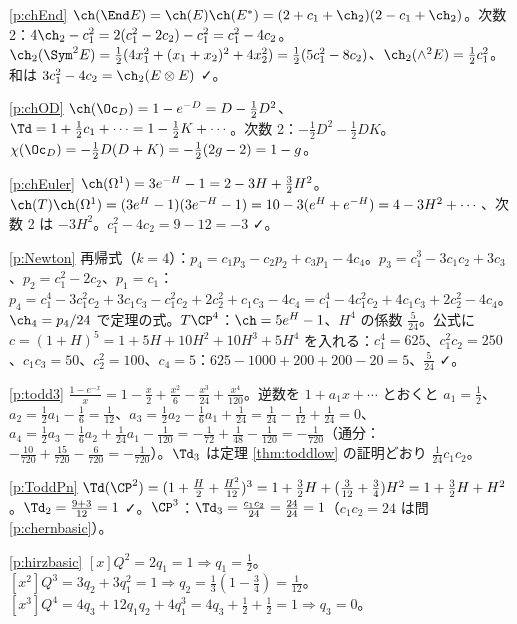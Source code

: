 \begin{sol}{\ref{p:chEnd}}
$\ch(\End E)=\ch(E)\ch(E^*)=(2+c_1+\ch_2)(2-c_1+\ch_2)$。次数 2：$4\ch_2-c_1^2=2(c_1^2-2c_2)-c_1^2=c_1^2-4c_2$。$\ch_2(\Sym^2E)=\frac12(4x_1^2+(x_1+x_2)^2+4x_2^2)=\frac12(5c_1^2-8c_2)$、$\ch_2(\wedge^2E)=\frac12c_1^2$。和は $3c_1^2-4c_2=\ch_2(E\otimes E)$ ✓。
\end{sol}
\begin{sol}{\ref{p:chOD}}
$\ch(\Oc_D)=1-e^{-D}=D-\frac12D^2$、$\Td=1+\frac12c_1+\cdots=1-\frac12K+\cdots$。次数 2：$-\frac12D^2-\frac12DK$。$\chi(\Oc_D)=-\frac12D(D+K)=-\frac12(2g-2)=1-g$。
\end{sol}
\begin{sol}{\ref{p:chEuler}}
$\ch(\Omega^1)=3e^{-H}-1=2-3H+\frac32H^2$。$\ch(T)\ch(\Omega^1)=(3e^H-1)(3e^{-H}-1)=10-3(e^H+e^{-H})=4-3H^2+\cdots$、次数 2 は $-3H^2$。$c_1^2-4c_2=9-12=-3$ ✓。
\end{sol}
\begin{sol}{\ref{p:Newton}}
再帰式（$k=4$）：$p_4=c_1p_3-c_2p_2+c_3p_1-4c_4$。$p_3=c_1^3-3c_1c_2+3c_3$、$p_2=c_1^2-2c_2$、$p_1=c_1$：$p_4=c_1^4-3c_1^2c_2+3c_1c_3-c_1^2c_2+2c_2^2+c_1c_3-4c_4=c_1^4-4c_1^2c_2+4c_1c_3+2c_2^2-4c_4$。$\ch_4=p_4/24$ で定理の式。$T\CP^4$：$\ch=5e^H-1$、$H^4$ の係数 $\frac5{24}$。公式に $c=(1+H)^5=1+5H+10H^2+10H^3+5H^4$ を入れる：$c_1^4=625$、$c_1^2c_2=250$、$c_1c_3=50$、$c_2^2=100$、$c_4=5$：$625-1000+200+200-20=5$、$\frac5{24}$ ✓。
\end{sol}
\begin{sol}{\ref{p:todd3}}
$\frac{1-e^{-x}}x=1-\frac x2+\frac{x^2}6-\frac{x^3}{24}+\frac{x^4}{120}$。逆数を $1+a_1x+\cdots$ とおくと $a_1=\frac12$、$a_2=\frac12a_1-\frac16=\frac1{12}$、$a_3=\frac12a_2-\frac16a_1+\frac1{24}=\frac1{24}-\frac1{12}+\frac1{24}=0$、$a_4=\frac12a_3-\frac16a_2+\frac1{24}a_1-\frac1{120}=-\frac1{72}+\frac1{48}-\frac1{120}=-\frac1{720}$（通分：$-\frac{10}{720}+\frac{15}{720}-\frac6{720}=-\frac1{720}$）。$\Td_3$ は定理 \ref{thm:toddlow} の証明どおり $\frac1{24}c_1c_2$。
\end{sol}
\begin{sol}{\ref{p:ToddPn}}
$\Td(\CP^2)=(1+\frac H2+\frac{H^2}{12})^3=1+\frac32H+(\frac3{12}+\frac34)H^2=1+\frac32H+H^2$。$\Td_2=\frac{9+3}{12}=1$ ✓。$\CP^3$：$\Td_3=\frac{c_1c_2}{24}=\frac{24}{24}=1$（$c_1c_2=24$ は問 \ref{p:chernbasic}）。
\end{sol}
\begin{sol}{\ref{p:hirzbasic}}
$[x]Q^2=2q_1=1\Rightarrow q_1=\frac12$。$[x^2]Q^3=3q_2+3q_1^2=1\Rightarrow q_2=\frac13(1-\frac34)=\frac1{12}$。$[x^3]Q^4=4q_3+12q_1q_2+4q_1^3=4q_3+\frac12+\frac12=1\Rightarrow q_3=0$。
\end{sol}
